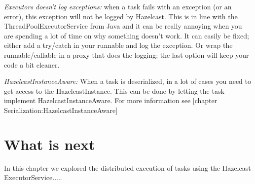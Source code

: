 \emph{Executors doesn't log exceptions:} when a task fails with an exception (or an error), this exception will not be logged by Hazelcast. This is in line with the ThreadPoolExecutorService from Java and it can be really annoying when you are spending a lot of time on why something doesn't work. It can easily be fixed; either add a try/catch in your runnable and log the exception. Or wrap the runnable/callable in a proxy that does the logging; the last option will keep your code a bit cleaner. 

\emph{HazelcastInstanceAware:} When a task is deserialized, in a lot of cases you need to get access to the HazelcastInstance. This can be done by letting the task implement HazelcastInstanceAware. For more information see [chapter Serialization:HazelcastInstanceAware]

\section{What is next}
In this chapter we explored the distributed execution of tasks using the Hazelcast ExecutorService.....